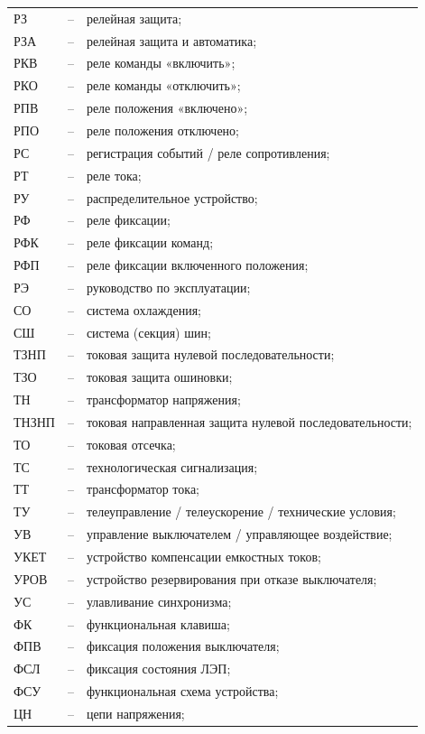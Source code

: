 \documentclass[a4paper, 12pt, table, hidelinks, DIV=calc]{extarticle}
\begin{document}
\begin{longtable}{>{\raggedright\arraybackslash}m{2cm}>{\raggedright\arraybackslash}m{0.5cm}>{\raggedright\arraybackslash}m{20cm}}
РЗ & -- & релейная защита; \\
РЗА & -- & релейная защита и автоматика; \\
РКВ & -- & реле команды «включить»; \\
РКО & -- & реле команды «отключить»; \\
РПВ & -- & реле положения «включено»; \\
РПО & -- & реле положения отключено; \\
РС & -- & регистрация событий / реле сопротивления; \\
РТ & -- & реле тока; \\
РУ & -- & распределительное устройство; \\
РФ & -- & реле фиксации; \\
РФК & -- & реле фиксации команд; \\
РФП & -- & реле фиксации включенного положения; \\
РЭ & -- & руководство по эксплуатации; \\
СО & -- & система охлаждения; \\
СШ & -- & система (секция) шин; \\
ТЗНП & -- & токовая защита нулевой последовательности; \\
ТЗО & -- & токовая защита ошиновки; \\
ТН & -- & трансформатор напряжения; \\
ТНЗНП & -- & токовая направленная защита нулевой последовательности; \\
ТО & -- & токовая отсечка; \\
ТС & -- & технологическая сигнализация; \\
ТТ & -- & трансформатор тока; \\
ТУ & -- & телеуправление / телеускорение / технические условия; \\
УВ & -- & управление выключателем / управляющее воздействие; \\
УКЕТ & -- & устройство компенсации емкостных токов; \\
УРОВ & -- & устройство резервирования при отказе выключателя; \\
УС & -- & улавливание синхронизма; \\
ФК & -- & функциональная клавиша; \\
ФПВ & -- & фиксация положения выключателя; \\
ФСЛ & -- & фиксация состояния ЛЭП; \\
ФСУ & -- & функциональная схема устройства; \\
ЦН & -- & цепи напряжения; \\

\end{longtable}
\end{document}
